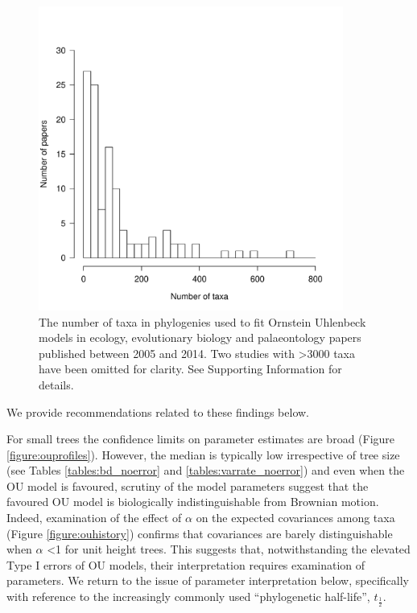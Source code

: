 \documentclass[a4paper,12pt]{article}
\begin{document}
    \begin{figure}[!htbp]
      \centering
      \includegraphics[width=10cm, height=10cm, keepaspectratio=true]{Figures/OhYou_Figure3.pdf}
      \caption{The number of taxa in phylogenies used to fit Ornstein Uhlenbeck models in ecology, evolutionary biology and palaeontology papers published between 2005 and 2014. Two studies with \textgreater 3000 taxa have been omitted for clarity. See Supporting Information for details.
      }
      \label{figure:ntaxa}
\end{figure} 

    We provide recommendations related to these findings below.

    For small trees the confidence limits on parameter estimates are broad (Figure \ref{figure:ouprofiles}). 
    However, the median is typically low irrespective of tree size (see Tables \ref{tables:bd_noerror} and \ref{tables:varrate_noerror}) and even when the OU model is favoured, scrutiny of the model parameters suggest that the favoured OU model is biologically indistinguishable from Brownian motion. 
    Indeed, examination of the effect of $\alpha$ on the expected covariances among taxa (Figure \ref{figure:ouhistory}) confirms that covariances are barely distinguishable when $\alpha$ \textless 1 for unit height trees. 
    This suggests that, notwithstanding the elevated Type I errors of OU models, their interpretation requires examination of parameters. 
    We return to the issue of parameter interpretation below, specifically with reference to the increasingly commonly used ``phylogenetic half-life'', $t_\frac{1}{2}$.
\end{document}
